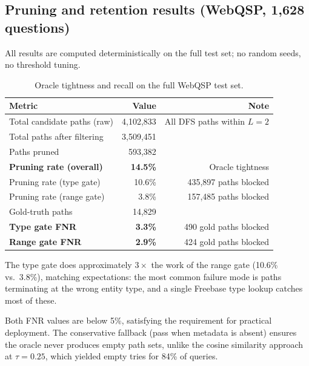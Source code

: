 \documentclass[11pt,twoside]{article}
\begin{document}
\subsection{Pruning and retention results (WebQSP, 1,628 questions)}

All results are computed deterministically on the full test set; no random seeds, no threshold tuning.

\begin{table}[H]
	\centering
	\caption{Oracle tightness and recall on the full WebQSP test set.}
	\label{tab:sir}
	\begin{tabular}{lrr}
		\toprule
		\textbf{Metric}                        & \textbf{Value}   & \textbf{Note}                  \\
		\midrule
		Total candidate paths (raw)             & 4,102,833        & All DFS paths within \(L=2\)   \\
		Total paths after filtering            & 3,509,451        &                                \\
		Paths pruned                            & 593,382          &                                \\
		\midrule
		\textbf{Pruning rate (overall)}         & \textbf{14.5\%}  & Oracle tightness               \\
		Pruning rate (type gate)               & 10.6\%           & 435,897 paths blocked          \\
		Pruning rate (range gate)              & 3.8\%            & 157,485 paths blocked          \\
		\midrule
		Gold-truth paths                        & 14,829           &                                \\
		\textbf{Type gate FNR}                  & \textbf{3.3\%}   & 490 gold paths blocked         \\
		\textbf{Range gate FNR}                 & \textbf{2.9\%}   & 424 gold paths blocked         \\
		\bottomrule
	\end{tabular}
\end{table}

The type gate does approximately \(3\times\) the work of the range gate (10.6\% vs.\ 3.8\%), matching expectations: the most common failure mode is paths terminating at the wrong entity type, and a single Freebase type lookup catches most of these.

Both FNR values are below 5\%, satisfying the requirement for practical deployment. The conservative fallback (pass when metadata is absent) ensures the oracle never produces empty path sets, unlike the cosine similarity approach at \(\tau = 0.25\), which yielded empty tries for 84\% of queries.
\end{document}
